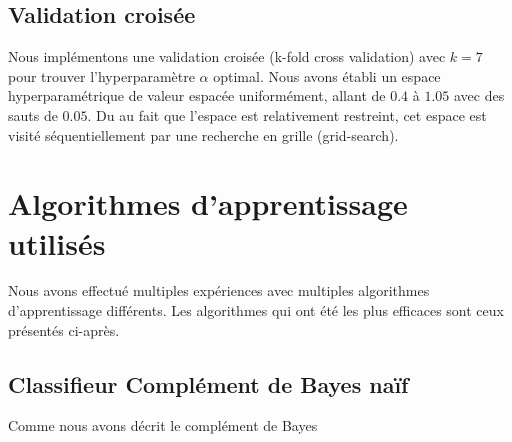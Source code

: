 \documentclass{article}
\begin{document}
\subsection{Validation croisée}
Nous implémentons une validation croisée (k-fold cross validation) avec $k = 7$ pour trouver l'hyperparamètre $\alpha$ optimal. Nous avons établi un espace hyperparamétrique de valeur espacée uniformément, allant de $0.4$ à $1.05$ avec des sauts de $0.05$. Du au fait que l'espace est relativement restreint, cet espace est visité séquentiellement par une recherche en grille (grid-search). 


\section{Algorithmes d'apprentissage utilisés}
Nous avons effectué multiples expériences avec multiples algorithmes d'apprentissage différents. Les algorithmes qui ont été les plus efficaces sont ceux présentés ci-après.
\subsection{Classifieur Complément de Bayes naïf}

Comme nous avons décrit le complément de Bayes
\end{document}
